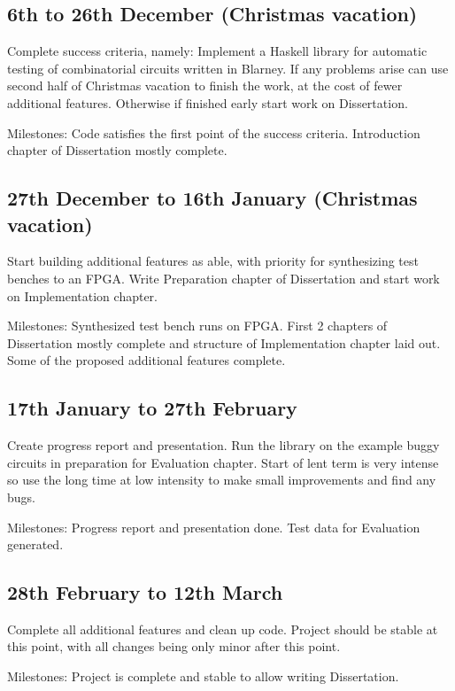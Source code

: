 \documentclass[UKenglish, 12pt]{article}
\begin{document}
\subsection*{6th to 26th December (Christmas vacation)}

Complete success criteria, namely: Implement a Haskell library for automatic
testing of combinatorial circuits written in Blarney. If any problems arise
can use second half of Christmas vacation to finish the work, at the cost of
fewer additional features. Otherwise if finished early start work on
Dissertation.

Milestones: Code satisfies the first point of the success criteria. Introduction
chapter of Dissertation mostly complete.

\subsection*{27th December to 16th January (Christmas vacation)}

Start building additional features as able, with priority for synthesizing test
benches to an FPGA. Write Preparation chapter of Dissertation and start work on
Implementation chapter.

Milestones: Synthesized test bench runs on FPGA. First 2 chapters of Dissertation
mostly complete and structure of Implementation chapter laid out. Some of the
proposed additional features complete.

\subsection*{17th January to 27th February}

Create progress report and presentation. 
Run the library on the example buggy circuits in preparation for Evaluation
chapter. Start of lent term is very intense so use the long time at low intensity
to make small improvements and find any bugs.

Milestones: Progress report and presentation done. Test data for Evaluation
generated.

\subsection*{28th February to 12th March}

Complete all additional features and clean up code. Project should be stable
at this point, with all changes being only minor after this point.

Milestones: Project is complete and stable to allow writing Dissertation.
\end{document}
